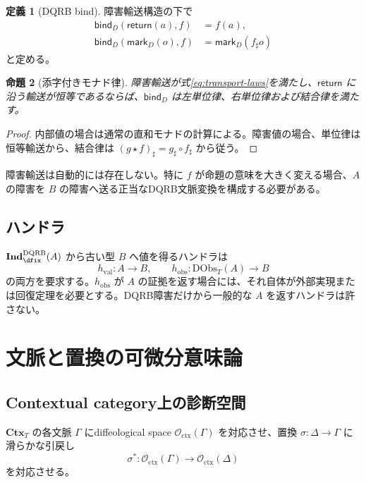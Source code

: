 \documentclass[a4paper,11pt]{ltjsarticle}
\theoremstyle{definition}
\newtheorem{definition}{定義}[section]
\theoremstyle{plain}
\newtheorem{proposition}[definition]{命題}
\newcommand{\DQRB}{\mathrm{DQRB}}
\newcommand{\Ctx}{\mathbf{Ctx}}
\newcommand{\DObs}{\mathrm{DObs}}
\newcommand{\DInd}{\mathbf{Ind}^{\DQRB}_{\dfix}}
\begin{document}
\begin{definition}[DQRB bind]
障害輸送構造の下で
\begin{align}
 \mathsf{bind}_D(\mathsf{return}(a),f)
 &=f(a),\\
 \mathsf{bind}_D(\mathsf{mark}_D(o),f)
 &=\mathsf{mark}_D(f_{\sharp}o)
 \label{eq:d-bind}
\end{align}
と定める。
\end{definition}

\begin{proposition}[添字付きモナド律]
障害輸送が式\eqref{eq:transport-laws}を満たし、$\mathsf{return}$ に沿う輸送が恒等であるならば、$\mathsf{bind}_D$ は左単位律、右単位律および結合律を満たす。
\end{proposition}

\begin{proof}
内部値の場合は通常の直和モナドの計算による。障害値の場合、単位律は恒等輸送から、結合律は $(g\mathbin{\star}f)_{\sharp}=g_{\sharp}\circ f_{\sharp}$ から従う。
\end{proof}

障害輸送は自動的には存在しない。特に $f$ が命題の意味を大きく変える場合、$A$ の障害を $B$ の障害へ送る正当なDQRB文脈変換を構成する必要がある。

\subsection{ハンドラ}

$\DInd(A)$ から古い型 $B$ へ値を得るハンドラは
\begin{equation}
 h_{\mathrm{val}}:A\to B,
 \qquad
 h_{\mathrm{obs}}:
 \DObs_T(A)\to B
 \label{eq:handler}
\end{equation}
の両方を要求する。$h_{\mathrm{obs}}$ が $A$ の証拠を返す場合には、それ自体が外部実現または回復定理を必要とする。DQRB障害だけから一般的な $A$ を返すハンドラは許さない。

\section{文脈と置換の可微分意味論}

\subsection{Contextual category上の診断空間}

$\Ctx_T$ の各文脈 $\Gamma$ にdiffeological space $\mathcal O_{\mathrm{ctx}}(\Gamma)$ を対応させ、置換 $\sigma:\Delta\to\Gamma$ に滑らかな引戻し
\begin{equation}
 \sigma^*:\mathcal O_{\mathrm{ctx}}(\Gamma)
 \longrightarrow\mathcal O_{\mathrm{ctx}}(\Delta)
 \label{eq:context-reindexing}
\end{equation}
を対応させる。
\end{document}
